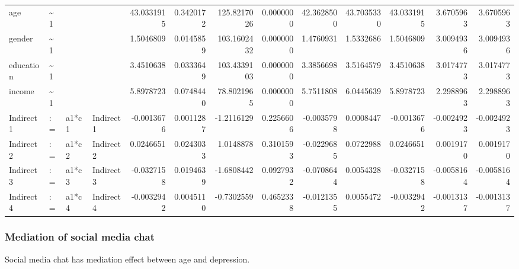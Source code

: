\documentclass[
]{article}
\begin{document}
\begin{table}[!h]
\begin{tabular}[t]{llllrrrrrrrrr}
age & \textasciitilde{}1 &  &  & 43.0331915 & 0.3420172 & 125.8217026 & 0.0000000 & 42.3628500 & 43.7035330 & 43.0331915 & 3.6705963 & 3.6705963\\
gender & \textasciitilde{}1 &  &  & 1.5046809 & 0.0145859 & 103.1602432 & 0.0000000 & 1.4760931 & 1.5332686 & 1.5046809 & 3.0094936 & 3.0094936\\
\addlinespace
education & \textasciitilde{}1 &  &  & 3.4510638 & 0.0333649 & 103.4339103 & 0.0000000 & 3.3856698 & 3.5164579 & 3.4510638 & 3.0174773 & 3.0174773\\
income & \textasciitilde{}1 &  &  & 5.8978723 & 0.0748440 & 78.8021965 & 0.0000000 & 5.7511808 & 6.0445639 & 5.8978723 & 2.2988963 & 2.2988963\\
Indirect1 & := & a1*c1 & Indirect1 & -0.0013676 & 0.0011287 & -1.2116129 & 0.2256606 & -0.0035798 & 0.0008447 & -0.0013676 & -0.0024923 & -0.0024923\\
Indirect2 & := & a1*c2 & Indirect2 & 0.0246651 & 0.0243033 & 1.0148878 & 0.3101593 & -0.0229685 & 0.0722988 & 0.0246651 & 0.0019170 & 0.0019170\\
Indirect3 & := & a1*c3 & Indirect3 & -0.0327158 & 0.0194639 & -1.6808442 & 0.0927932 & -0.0708644 & 0.0054328 & -0.0327158 & -0.0058164 & -0.0058164\\
\addlinespace
Indirect4 & := & a1*c4 & Indirect4 & -0.0032942 & 0.0045110 & -0.7302559 & 0.4652338 & -0.0121355 & 0.0055472 & -0.0032942 & -0.0013137 & -0.0013137\\
\bottomrule
\end{tabular}
\end{table}

\newpage

\hypertarget{mediation-of-social-media-chat}{%
\subsubsection{Mediation of social media
chat}\label{mediation-of-social-media-chat}}

Social media chat has mediation effect between age and depression.
\end{document}
